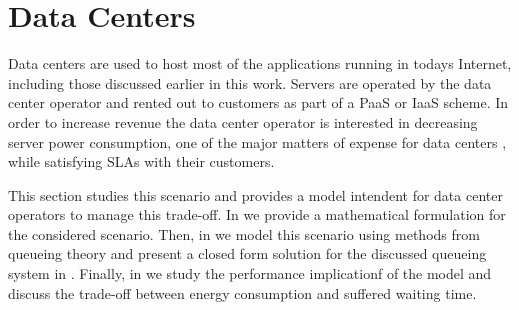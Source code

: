 \section{Data Centers}\label{sec:cloud:data_centers}
Data centers are used to host most of the applications running in todays Internet, including those discussed earlier in this work.
Servers are operated by the data center operator and rented out to customers as part of a \gls{PaaS} or \gls{IaaS} scheme.
In order to increase revenue the data center operator is interested in decreasing server power consumption, one of the major matters of expense for data centers \cite{Greenberg2009b}, while satisfying \glspl{SLA} with their customers.

This section studies this scenario and provides a model intendent for data 	center operators to manage this trade-off.
In  we provide a mathematical formulation for the considered scenario.
Then, in  we model this scenario using methods from queueing theory and present a closed form solution for the discussed queueing system in .
Finally, in  we study the performance implicationf of the model and discuss the trade-off between energy consumption and suffered waiting time.




